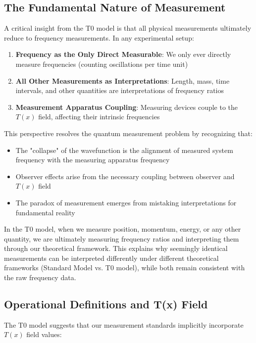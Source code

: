 \documentclass[12pt,a4paper]{article}
\newcommand{\Tfield}{T(x)}
\begin{document}
	\subsection{The Fundamental Nature of Measurement}
	
	A critical insight from the T0 model is that all physical measurements ultimately reduce to frequency measurements. In any experimental setup:
	
	\begin{enumerate}
		\item \textbf{Frequency as the Only Direct Measurable}: We only ever directly measure frequencies (counting oscillations per time unit)
		\item \textbf{All Other Measurements as Interpretations}: Length, mass, time intervals, and other quantities are interpretations of frequency ratios
		\item \textbf{Measurement Apparatus Coupling}: Measuring devices couple to the $\Tfield$ field, affecting their intrinsic frequencies
	\end{enumerate}
	
	This perspective resolves the quantum measurement problem by recognizing that:
	
	\begin{itemize}
		\item The "collapse" of the wavefunction is the alignment of measured system frequency with the measuring apparatus frequency
		\item Observer effects arise from the necessary coupling between observer and $\Tfield$ field
		\item The paradox of measurement emerges from mistaking interpretations for fundamental reality
	\end{itemize}
	
	In the T0 model, when we measure position, momentum, energy, or any other quantity, we are ultimately measuring frequency ratios and interpreting them through our theoretical framework. This explains why seemingly identical measurements can be interpreted differently under different theoretical frameworks (Standard Model vs. T0 model), while both remain consistent with the raw frequency data.
	
	\subsection{Operational Definitions and T(x) Field}
	
	The T0 model suggests that our measurement standards implicitly incorporate $\Tfield$ field values:
	
\end{document}
